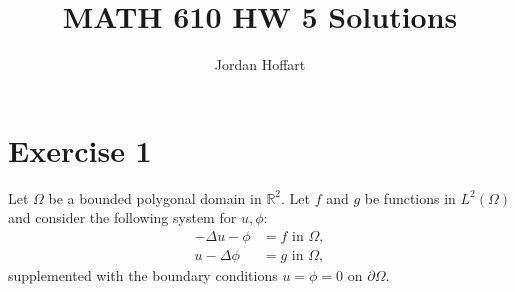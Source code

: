 \documentclass{article}
\title{MATH 610 HW 5 Solutions}
\author{Jordan Hoffart}
\date{}
\begin{document}
\maketitle

\section*{Exercise 1}
Let $\Omega$ be a bounded polygonal domain in $\mathbb R^2$.
Let $f$ and $g$ be functions in $L^2(\Omega)$ and consider the following system for $u,\phi$:
\begin{align*}
	-\Delta u - \phi & = f \text{ in } \Omega, \\
	u - \Delta \phi  & = g \text{ in } \Omega,
\end{align*}
supplemented with the boundary conditions $u = \phi = 0$ on $\partial \Omega$.
\end{document}
